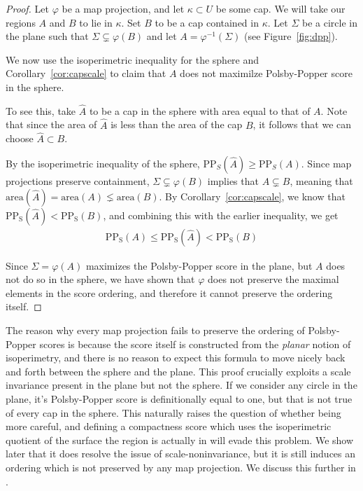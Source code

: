 \begin{proof}
  Let $\varphi$ be a map projection, and let 
  $\kappa \subset U$ be some cap. We will take our regions 
  $A$ and $B$ to lie in $\kappa$. Set $B$ to be a cap 
  contained in $\kappa$. Let $\Sigma$ be a circle in 
  the plane such that $\Sigma
  \subsetneq \varphi(B)$ and let $A=\varphi^{-1}(\Sigma)$ (see
  Figure~\ref{fig:dpp}).

  We now use the isoperimetric inequality for the sphere 
  and Corollary~\ref{cor:capscale} to claim that 
  $A$ does not maximilze Polsby-Popper score in the sphere.

  To see this, take $\hat{A}$ to be a cap in the sphere with 
  area equal to that of $A$. Note that since the 
  area of $\hat {A}$ is less than the area of the cap $B$, it 
  follows that we can choose $\hat{A}\subset B$. 
  
  By the isoperimetric inequality of the sphere, 
  $\mathrm{PP}_S(\hat{A})\geq
  \mathrm{PP}_S(A)$. Since map projections preserve containment,
  $\Sigma\subsetneq \varphi(B)$ implies that $A\subsetneq B$, 
  meaning that $\mathrm{area}(\hat A) = \mathrm{area}(A)\lneq 
  \mathrm{area}(B)$. By Corollary~\ref{cor:capscale}, we know that
  $\mathrm{PP_S}(\hat{A})< \mathrm{PP_S}(B)$, and combining this with
  the earlier inequality, we get
  \begin{align*}
    \mathrm{PP_S}({A})\leq \mathrm{PP_S}(\hat{A})< \mathrm{PP_S}(B)
  \end{align*}

  Since $\Sigma = \varphi(A)$ maximizes the Polsby-Popper score in the
  plane, but $A$ does not do so in the sphere, we have shown that
  $\varphi$ does not preserve the maximal elements in the score
  ordering, and therefore it cannot preserve the ordering itself.
\end{proof}

The reason why every map projection fails to preserve the ordering of
Polsby-Popper scores is because the score itself is constructed from
the \textit{planar} notion of isoperimetry, and there is no reason to
expect this formula to move nicely back and forth between the sphere
and the plane.  This proof crucially exploits a scale invariance
present in the plane but not the sphere.  If we consider any circle in
the plane, it's Polsby-Popper score is definitionally equal to one,
but that is not true of every cap in the sphere.  This naturally
raises the question of whether being more careful, and defining
a compactness score which uses the isoperimetric quotient of the
surface the region is actually in will evade this problem.  We show
later that it does resolve the issue of scale-noninvariance, but it is
still induces an ordering which is not preserved by any map
projection.  We discuss this further in .
